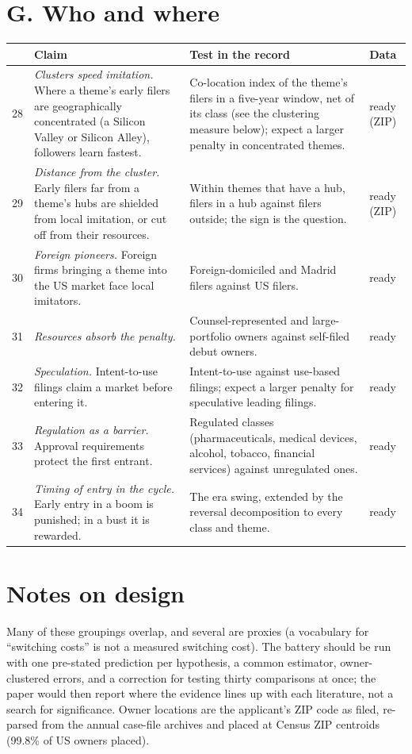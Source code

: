 \section*{G. Who and where}

\begin{longtable}{p{0.4cm}p{5.3cm}p{6.2cm}p{1.5cm}}
\toprule
& Claim & Test in the record & Data \\
\midrule
\endhead
28 & \emph{Clusters speed imitation.} Where a theme's early filers are
geographically concentrated (a Silicon Valley or Silicon Alley),
followers learn fastest. & Co-location index of the theme's filers
in a five-year window, net of its class (see the clustering measure
below); expect a larger penalty in concentrated themes. & ready (ZIP) \\
29 & \emph{Distance from the cluster.} Early filers far from a theme's
hubs are shielded from local imitation, or cut off from their
resources. & Within themes that have a hub, filers in a hub against
filers outside; the sign is the question. & ready (ZIP) \\
30 & \emph{Foreign pioneers.} Foreign firms bringing a theme into the US
market face local imitators. & Foreign-domiciled and Madrid filers
against US filers. & ready \\
31 & \emph{Resources absorb the penalty.} & Counsel-represented and
large-portfolio owners against self-filed debut owners. & ready \\
32 & \emph{Speculation.} Intent-to-use filings claim a market before
entering it. & Intent-to-use against use-based filings; expect a larger
penalty for speculative leading filings. & ready \\
33 & \emph{Regulation as a barrier.} Approval requirements protect the
first entrant. & Regulated classes (pharmaceuticals, medical devices,
alcohol, tobacco, financial services) against unregulated ones. &
ready \\
34 & \emph{Timing of entry in the cycle.} Early entry in a boom is
punished; in a bust it is rewarded. & The era swing, extended by the
reversal decomposition to every class and theme. & ready \\
\bottomrule
\end{longtable}

\section*{Notes on design}

Many of these groupings overlap, and several are proxies (a vocabulary
for ``switching costs'' is not a measured switching cost). The battery
should be run with one pre-stated prediction per hypothesis, a common
estimator, owner-clustered errors, and a correction for testing thirty
comparisons at once; the paper would then report where the evidence
lines up with each literature, not a search for significance. Owner
locations are the applicant's ZIP code as filed, re-parsed from the
annual case-file archives and placed at Census ZIP centroids (99.8\% of
US owners placed).









\clearpage






